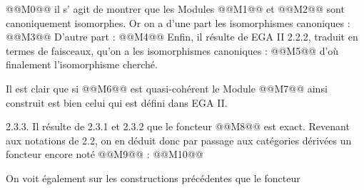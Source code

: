 
@@M0@@
il s'%
agit de montrer que les Modules @@M1@@ et @@M2@@
sont canoniquement isomorphes. Or on a d'une part les isomorphismes canoniques :
@@M3@@
D'autre part :
@@M4@@
Enfin, il résulte de EGA II 2.2.2, traduit en termes de faisceaux, qu'on a les isomorphismes canoniques :
@@M5@@
d'où finalement l'isomorphisme cherché.

Il est clair que si @@M6@@ est quasi-cohérent le Module @@M7@@ ainsi construit est bien celui qui est défini dans EGA II.

2.3.3. Il résulte de 2.3.1 et 2.3.2 que le foncteur @@M8@@ est exact. Revenant aux notations de 2.2, on en déduit donc par passage aux catégories dérivées un foncteur encore noté @@M9@@ :
@@M10@@

On voit également sur les constructions précédentes que le foncteur
